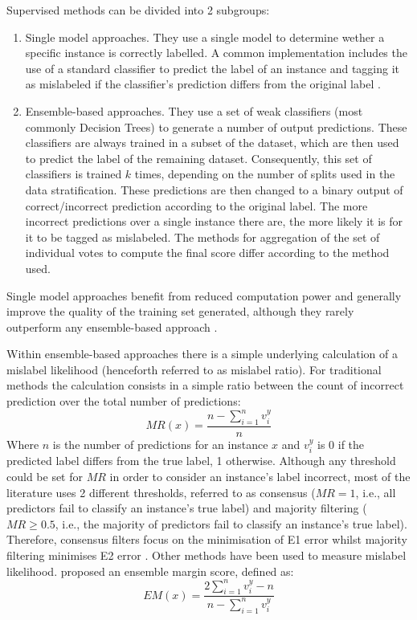 \documentclass[12pt, english, openany]{book}
\begin{document}
Supervised methods can be divided into 2 subgroups:
\begin{enumerate}
  \item Single model approaches. They use a single model to determine wether a
  specific instance is correctly labelled. A common implementation includes the
  use of a standard classifier to predict the label of an instance and tagging
  it as mislabeled if the classifier's prediction differs from the original
  label \cite{Brodley1999}.
  \item Ensemble-based approaches. They use a set of weak classifiers (most
  commonly Decision Trees) to generate a number of output predictions. These
  classifiers are always trained in a subset of the dataset, which are then
  used to predict the label of the remaining dataset. Consequently, this set of
  classifiers is trained $k$ times, depending on the number of splits used in
  the data stratification. These predictions are then changed to a binary
  output of correct/incorrect prediction according to the original label. The
  more incorrect predictions over a single instance there are, the more likely
  it is for it to be tagged as mislabeled. The methods for aggregation of the
  set of individual votes to compute the final score differ according to the
  method used.
\end{enumerate}

Single model approaches benefit from reduced computation power and generally
improve the quality of the training set generated, although they rarely
outperform any ensemble-based approach \cite{Brodley1999, Garcia-Gil2019,
Boukir2019, Pelletier2017Filtering, Zhang2018, Yuan2018}.

Within ensemble-based approaches there is a simple underlying calculation of a
mislabel likelihood (henceforth referred to as mislabel ratio). For traditional
methods the calculation consists in a simple ratio between the count of
incorrect prediction over the total number of predictions:
\begin{equation} \label{eq:mislabel-ratio}
  MR(x) = \frac{n-\sum_{i=1}^{n}{v_i^y}}{n}
\end{equation}
Where $n$ is the number of predictions for an instance $x$ and $v_i^y$ is 0 if
the predicted label differs from the true label, 1 otherwise. Although any
threshold could be set for $MR$ in order to consider an instance's label
incorrect, most of the literature uses 2 different thresholds, referred to as
consensus ($MR=1$, i.e., all predictors fail to classify an instance's true
label) and majority filtering ($MR\geq0.5$, i.e., the majority of predictors
fail to classify an instance's true label). Therefore, consensus filters focus
on the minimisation of E1 error whilst majority filtering minimises E2 error
\cite{Brodley1999, Yuan2018}. Other methods have been used to measure mislabel
likelihood. \cite{Boukir2019} proposed an ensemble margin score, defined as:
\begin{equation} \label{eq:ensemble-margin}
  EM(x) = \frac{2\sum_{i=1}^{n}{v_i^y}-n}{n-\sum_{i=1}^{n}{v_i^y}}
\end{equation}
\end{document}
